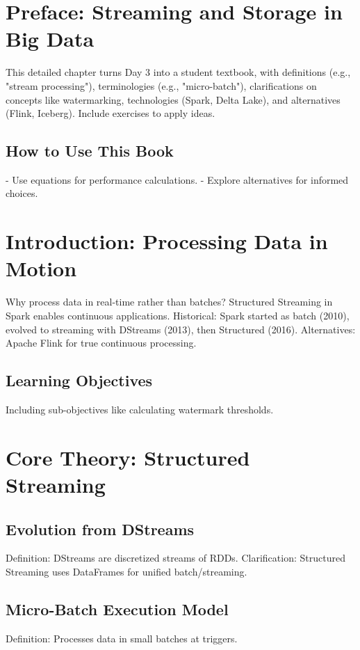 \documentclass[11pt]{article}
\begin{document}
\tableofcontents
\newpage

\section{Preface: Streaming and Storage in Big Data}
This detailed chapter turns Day 3 into a student textbook, with definitions (e.g., "stream processing"), terminologies (e.g., "micro-batch"), clarifications on concepts like watermarking, technologies (Spark, Delta Lake), and alternatives (Flink, Iceberg). Include exercises to apply ideas.

\subsection{How to Use This Book}
- Use equations for performance calculations.
- Explore alternatives for informed choices.

\section{Introduction: Processing Data in Motion}
Why process data in real-time rather than batches? Structured Streaming in Spark enables continuous applications. Historical: Spark started as batch (2010), evolved to streaming with DStreams (2013), then Structured (2016). Alternatives: Apache Flink for true continuous processing.

\subsection{Learning Objectives}
Including sub-objectives like calculating watermark thresholds.

\section{Core Theory: Structured Streaming}
\subsection{Evolution from DStreams}
Definition: DStreams are discretized streams of RDDs. Clarification: Structured Streaming uses DataFrames for unified batch/streaming.

\subsection{Micro-Batch Execution Model}
Definition: Processes data in small batches at triggers.
\end{document}
